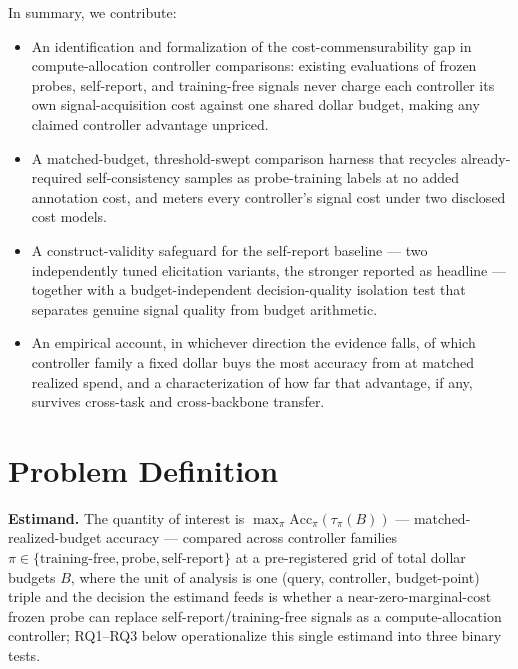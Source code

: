 \documentclass[11pt]{article}
\begin{document}
In summary, we contribute:
\begin{itemize}[leftmargin=1.4em]
\item An identification and formalization of the cost-commensurability gap in compute-allocation controller comparisons: existing evaluations of frozen probes, self-report, and training-free signals never charge each controller its own signal-acquisition cost against one shared dollar budget, making any claimed controller advantage unpriced.
\item A matched-budget, threshold-swept comparison harness that recycles already-required self-consistency samples as probe-training labels at no added annotation cost, and meters every controller's signal cost under two disclosed cost models.
\item A construct-validity safeguard for the self-report baseline --- two independently tuned elicitation variants, the stronger reported as headline --- together with a budget-independent decision-quality isolation test that separates genuine signal quality from budget arithmetic.
\item An empirical account, in whichever direction the evidence falls, of which controller family a fixed dollar buys the most accuracy from at matched realized spend, and a characterization of how far that advantage, if any, survives cross-task and cross-backbone transfer.
\end{itemize}

\section{Problem Definition}

\noindent\textbf{Estimand.} The quantity of interest is $\max_\pi \text{Acc}_\pi(\tau_\pi(B))$ --- matched-realized-budget accuracy --- compared across controller families $\pi \in \{\text{training-free}, \text{probe}, \text{self-report}\}$ at a pre-registered grid of total dollar budgets $B$, where the unit of analysis is one (query, controller, budget-point) triple and the decision the estimand feeds is whether a near-zero-marginal-cost frozen probe can replace self-report/training-free signals as a compute-allocation controller; RQ1--RQ3 below operationalize this single estimand into three binary tests.
\end{document}
